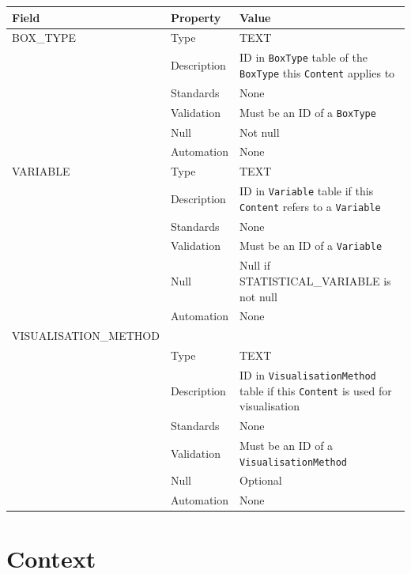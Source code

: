 \documentclass[
]{article}
\newcounter{none}
\begin{document}
{\def\LTcaptype{none} 
\begin{longtable}[]{@{}
  >{\raggedright\arraybackslash}p{}
  >{\raggedright\arraybackslash}p{}
  >{\raggedright\arraybackslash}p{}@{}}
\toprule\noalign{}
\begin{minipage}[b]{\linewidth}\raggedright
Field
\end{minipage} & \begin{minipage}[b]{\linewidth}\raggedright
Property
\end{minipage} & \begin{minipage}[b]{\linewidth}\raggedright
Value
\end{minipage} \\
\midrule\noalign{}
\endhead
\bottomrule\noalign{}
\endlastfoot
BOX\_TYPE & Type & TEXT \\
& Description & ID in \texttt{BoxType} table of the \texttt{BoxType}
this \texttt{Content} applies to \\
& Standards & None \\
& Validation & Must be an ID of a \texttt{BoxType} \\
& Null & Not null \\
& Automation & None \\
VARIABLE & Type & TEXT \\
& Description & ID in \texttt{Variable} table if this \texttt{Content}
refers to a \texttt{Variable} \\
& Standards & None \\
& Validation & Must be an ID of a \texttt{Variable} \\
& Null & Null if STATISTICAL\_VARIABLE is not null \\
& Automation & None \\
VISUALISATION\_METHOD & & \\
& Type & TEXT \\
& Description & ID in \texttt{VisualisationMethod} table if this
\texttt{Content} is used for visualisation \\
& Standards & None \\
& Validation & Must be an ID of a \texttt{VisualisationMethod} \\
& Null & Optional \\
& Automation & None \\
\end{longtable}
}

\section{Context}\label{context}
\end{document}
